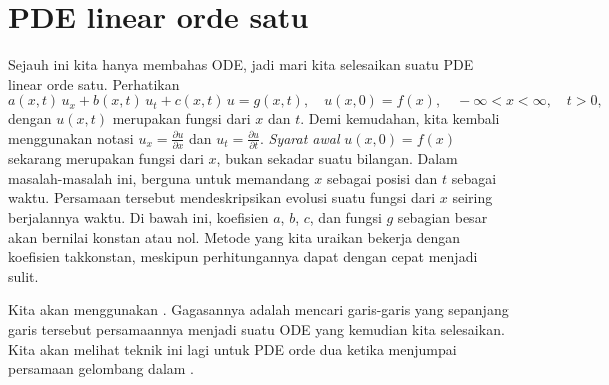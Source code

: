 
\sectionnewpage
\section{PDE linear orde satu}
\label{fopde:section}


Sejauh ini kita hanya membahas ODE, jadi mari kita selesaikan suatu PDE linear orde satu\@.
Perhatikan
\begin{equation*}
a(x,t) \, u_x + b(x,t) \, u_t + c(x,t) \, u = g(x,t), \quad u(x,0) = f(x) , \quad -\infty < x < \infty,
\quad t > 0 ,
\end{equation*}
dengan $u(x,t)$ merupakan fungsi dari $x$ dan $t$.
Demi kemudahan, kita kembali menggunakan notasi $u_x = \frac{\partial u}{\partial x}$ dan
$u_t = \frac{\partial u}{\partial t}$.
\emph{Syarat awal}
$u(x,0) = f(x)$ sekarang merupakan fungsi dari $x$, bukan sekadar suatu bilangan.
Dalam masalah-masalah ini, berguna untuk memandang $x$ sebagai posisi dan $t$ sebagai waktu.
Persamaan tersebut mendeskripsikan evolusi suatu fungsi dari $x$
seiring berjalannya waktu.
Di bawah ini, koefisien $a$, $b$, $c$, dan fungsi $g$
sebagian besar akan bernilai konstan atau nol.
Metode yang kita uraikan bekerja dengan koefisien takkonstan,
meskipun perhitungannya dapat dengan cepat menjadi sulit.

Kita akan menggunakan
\emph{}.
Gagasannya adalah mencari garis-garis yang sepanjang garis tersebut persamaannya menjadi
suatu ODE yang kemudian kita selesaikan.
Kita akan melihat teknik ini lagi untuk PDE orde dua
ketika menjumpai persamaan gelombang dalam .


